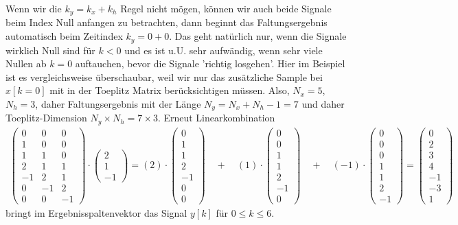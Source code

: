 Wenn wir die $k_y = k_x + k_h$ Regel nicht mögen, können wir auch beide Signale
beim Index Null anfangen zu betrachten, dann beginnt das Faltungsergebnis automatisch
beim Zeitindex $k_y = 0 + 0$. Das geht natürlich nur, wenn
die Signale wirklich Null sind für $k<0$ und es ist u.U. sehr aufwändig, wenn
sehr viele Nullen ab $k=0$ auftauchen, bevor die Signale 'richtig losgehen'. Hier im
Beispiel ist es vergleichsweise überschaubar, weil wir nur das zusätzliche
Sample bei $x[k=0]$ mit in der Toeplitz Matrix berücksichtigen müssen.
Also, $N_x = 5$, $N_h = 3$, daher Faltungsergebnis mit der Länge $N_y = N_x + N_h -1 = 7$ und
daher Toeplitz-Dimension $N_y \times N_h = 7 \times 3$.
%
Erneut Linearkombination
\begin{align}
\begin{pmatrix}
0 & 0 & 0 \\
1 & 0 & 0 \\
1 & 1 & 0 \\
2 & 1 & 1 \\
-1 & 2 & 1 \\
0 & -1 & 2 \\
0 & 0 & -1
\end{pmatrix}
\cdot
\begin{pmatrix}
2\\1\\-1
\end{pmatrix}
=
(2) \cdot
\begin{pmatrix}
0 \\
1\\
1\\
2\\
-1\\
0 \\
0
\end{pmatrix}
\quad+\quad
(1) \cdot
\begin{pmatrix}
0 \\
0\\
1\\
1\\
2\\
-1\\
0
\end{pmatrix}
\quad+\quad
(-1) \cdot
\begin{pmatrix}
0 \\
0 \\
0 \\
1 \\
1 \\
2 \\
-1
\end{pmatrix}
=
\begin{pmatrix}
0 \\
2 \\
3 \\
4 \\
-1 \\
-3 \\
1
\end{pmatrix}
\end{align}
%
bringt im Ergebnisspaltenvektor das Signal $y[k]$ für $0 \leq k \leq 6$.

